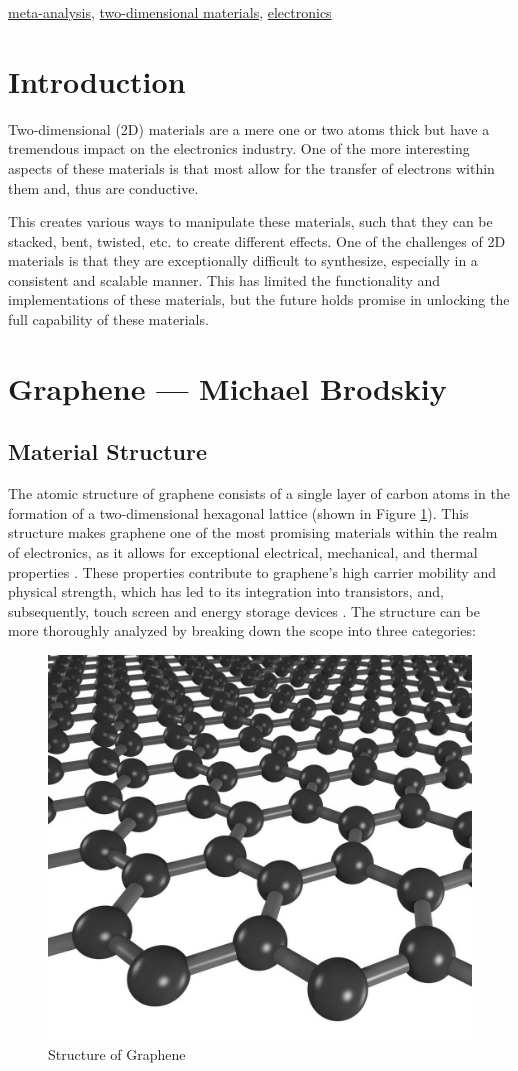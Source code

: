 \documentclass[conference]{IEEEtran}
\begin{document}
\begin{IEEEkeywords}
  \underline{meta-analysis}, \underline{two-dimensional materials}, \underline{electronics}
\end{IEEEkeywords}

\section{Introduction}

Two-dimensional (2D) materials are a mere one or two atoms thick but have a tremendous impact on the electronics industry. One of the more interesting aspects of these materials is that most allow for the transfer of electrons within them and, thus are conductive. 

This creates various ways to manipulate these materials, such that they can be stacked, bent, twisted, etc. to create different effects. 
One of the challenges of 2D materials is that they are exceptionally difficult to synthesize, especially in a consistent and scalable manner. This has limited the functionality and implementations of these materials, but the future holds promise in unlocking the full capability of these materials.

\section{Graphene — Michael Brodskiy}

\subsection{Material Structure}

The atomic structure of graphene consists of a single layer of carbon atoms in the formation of a two-dimensional hexagonal lattice (shown in Figure \ref{fig:1}). This structure makes graphene one of the most promising materials within the realm of electronics, as it allows for exceptional electrical, mechanical, and thermal properties \cite{mb1}. These properties contribute to graphene's high carrier mobility and physical strength, which has led to its integration into transistors, and, subsequently, touch screen and energy storage devices \cite{mb2}. The structure can be more thoroughly analyzed by breaking down the scope into three categories:

\begin{figure}[h]
  \centering
  \includegraphics[width=.4\textwidth]{Figures/Graphene}
  \caption{Structure of Graphene}
  \label{fig:1}
\end{figure}
\end{document}
